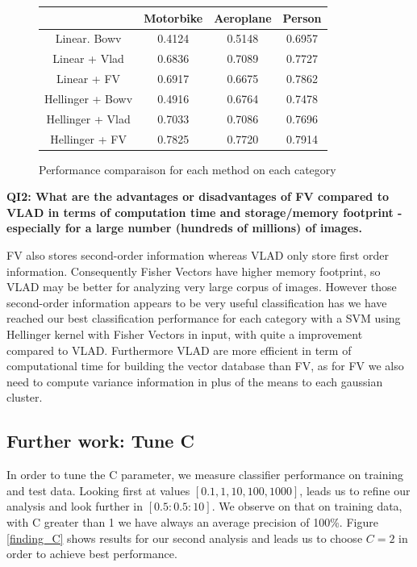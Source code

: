 \documentclass[a4paper,11pt]{exam}
\begin{document}
\begin{figure}[!h]
\begin{center}
	\begin{tabular}{ c | c | c | c }
   		 \hline
		    & Motorbike & Aeroplane & Person \\
		   \hline
		   Linear. Bowv & 0.4124 &  0.5148 & 0.6957 \\
		   Linear + Vlad & 0.6836 & 0.7089 &  0.7727  \\
		   Linear + FV & 0.6917 & 0.6675 & 0.7862 \\
		   Hellinger + Bowv & 0.4916 & 0.6764 &  0.7478 \\
		   Hellinger + Vlad & 0.7033 & 0.7086  & 0.7696 \\
		   Hellinger + FV & 0.7825 & 0.7720 & 0.7914 \\
		\hline
 	\end{tabular}
\end{center}
\caption{Performance comparaison for each method on each category}    
\label{table_perf}
\end{figure}    
    
\textbf{QI2: What are the advantages or disadvantages of FV compared to VLAD in terms of computation time and storage/memory footprint - especially for a large number (hundreds of millions) of images.\\}

FV also stores second-order information whereas VLAD only store first order information. Consequently Fisher Vectors have higher memory footprint, so VLAD may be better for analyzing very large corpus of images. However those second-order information appears to be very useful classification has we have reached our best classification performance for each category with a SVM using Hellinger kernel with Fisher Vectors in input, with quite a improvement compared to VLAD. Furthermore VLAD are more efficient in term of computational time for building the vector database than FV, as for FV we also need to compute variance information in plus of the means to each gaussian cluster.\\


\subsection{Further work: Tune C}

In order to tune the C parameter, we measure classifier performance on training and test data. Looking first at values $[0.1, 1, 10, 100, 1000]$, leads us to refine our analysis and look further in $[0.5:0.5:10]$. We observe on that on training data, with C greater than 1 we have always an average precision of 100\%. Figure \ref{finding_C} shows results for our second analysis and leads us to choose $C = 2$ in order to achieve best performance.
\end{document}
